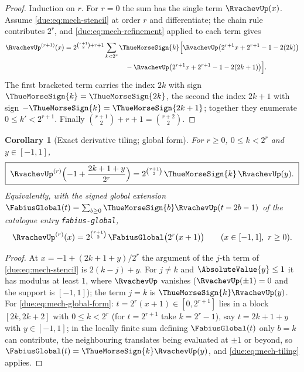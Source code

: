 \documentclass[11pt,oneside]{article}
\theoremstyle{plain}
\newtheorem{corollary}[theorem]{Corollary}
\theoremstyle{definition}
\theoremstyle{remark}
\begin{document}
\begin{proof}
Induction on \(r\).  For \(r=0\) the sum has the single term
\(\RvachevUp(x)\).  Assume \cref{due:eq:mech-stencil} at order \(r\) and
differentiate; the chain rule contributes \(2^{r}\), and
\cref{due:eq:mech-refinement} applied to each term gives
\begin{align*}
 \RvachevUp^{(r+1)}(x)
 &=2^{\binom{r+1}{2}+r+1}\sum_{k<2^{r}}\ThueMorseSign{k}
 \Bigl[\RvachevUp\bigl(2^{r+1}x+2^{r+1}-1-2(2k)\bigr)\\
 &\hspace{9em}-\RvachevUp\bigl(2^{r+1}x+2^{r+1}-1-2(2k+1)\bigr)\Bigr].
\end{align*}
The first bracketed term carries the index \(2k\) with sign
\(\ThueMorseSign{k}=\ThueMorseSign{2k}\), the second the index \(2k+1\) with sign
\(-\ThueMorseSign{k}=\ThueMorseSign{2k+1}\); together they enumerate
\(0\le k'<2^{r+1}\).  Finally \(\binom{r+1}{2}+r+1=\binom{r+2}{2}\).
\end{proof}

\begin{corollary}[Exact derivative tiling; global form]
\label{due:cor:mech-tiling}
For \(r\ge0\), \(0\le k<2^{r}\) and \(y\in[-1,1]\),
\begin{equation}
 \boxed{\;
 \RvachevUp^{(r)}\Bigl(-1+\frac{2k+1+y}{2^{r}}\Bigr)
 =2^{\binom{r+1}{2}}\,\ThueMorseSign{k}\,\RvachevUp(y).\;}
 \label{due:eq:mech-tiling}
\end{equation}
Equivalently, with the signed global extension
\(\FabiusGlobal(t)=\sum_{b\ge0}\ThueMorseSign{b}\RvachevUp(t-2b-1)\) of the
catalogue entry \texttt{fabius-global},
\begin{equation}
 \RvachevUp^{(r)}(x)=2^{\binom{r+1}{2}}\,\FabiusGlobal\bigl(2^{r}(x+1)\bigr)
 \qquad(x\in[-1,1],\ r\ge0).
 \label{due:eq:mech-global-form}
\end{equation}
\end{corollary}

\begin{proof}
At \(x=-1+(2k+1+y)/2^{r}\) the argument of the \(j\)-th term of
\cref{due:eq:mech-stencil} is \(2(k-j)+y\).  For \(j\ne k\) and
\(\AbsoluteValue{y}\le1\) it has modulus at least \(1\), where
\(\RvachevUp\) vanishes (\(\RvachevUp(\pm1)=0\) and the support is
\([-1,1]\)); the term \(j=k\) is \(\ThueMorseSign{k}\RvachevUp(y)\).  For
\cref{due:eq:mech-global-form}: \(t=2^{r}(x+1)\in[0,2^{r+1}]\) lies in a block
\([2k,2k+2]\) with \(0\le k<2^{r}\) (for \(t=2^{r+1}\) take \(k=2^{r}-1\)),
say \(t=2k+1+y\) with \(y\in[-1,1]\); in the locally finite sum defining
\(\FabiusGlobal(t)\) only \(b=k\) can contribute, the neighbouring translates
being evaluated at \(\pm1\) or beyond, so \(\FabiusGlobal(t)=\ThueMorseSign{k}\RvachevUp(y)\),
and \cref{due:eq:mech-tiling} applies.
\end{proof}
\end{document}

